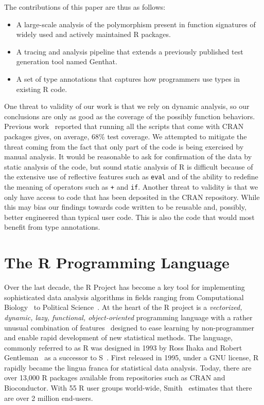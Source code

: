 \documentclass[acmsmall,10pt,review,anonymous]{acmart}\settopmatter{printfolios=true,printccs=false,printacmref=false}
\newcommand{\code}[1]{\lstinline|#1|\xspace}
\newcommand{\genthat}{{\sc Genthat}\xspace}
\begin{document}
The contributions of this paper are thus as follows:
\begin{itemize}
\item A large-scale analysis of the polymorphism present in function
  signatures of \PACKAGES widely used and actively maintained R packages.
\item A tracing and analysis pipeline that extends a previously published
  test generation tool named \genthat.
\item A set of type annotations that captures how programmers use types
in existing R code.
\end{itemize}

One threat to validity of our work is that we rely on dynamic analysis, so
our conclusions are only as good as the coverage of the possibly function
behaviors. Previous work~\cite{issta18} reported that running all the
scripts that come with CRAN packages gives, on average, 68\% test coverage.
We attempted to mitigate the threat coming from the fact that only part of
the code is being exercised by manual analysis. It would be reasonable to
ask for confirmation of the data by static analysis of the code, but sound
static analysis of R is difficult because of the extensive use of reflective
features such as \code{eval} and of the ability to redefine the meaning of
operators such as \code{+} and \code{if}.  Another threat to validity is
that we only have access to code that has been deposited in the CRAN
repository. While this may bias our findings towards code written to be
reusable and, possibly, better engineered than typical user code. This is
also the code that would most benefit from type annotations.

\newpage  %

\section{The R Programming Language}\label{sec:rlang}

Over the last decade, the R Project has become a key tool for implementing
sophisticated data analysis algorithms in fields ranging from Computational
Biology~\cite{R05} to Political Science~\cite{R:Keele:2008}. At the heart of
the R project is a \emph{vectorized, dynamic, lazy, functional,
  object-oriented} programming language with a rather unusual combination of
features~\cite{ecoop12} designed to ease learning by non-programmer and
enable rapid development of new statistical methods.  The language, commonly
referred to as R was designed in 1993 by Ross Ihaka and Robert
Gentleman~\cite{R96} as a successor to S~\cite{S88}.  First released in
1995, under a GNU license, R rapidly became the lingua franca for
statistical data analysis. Today, there are over 13,000 R packages available
from repositories such as CRAN and Bioconductor.  With 55 R user groups
world-wide, Smith~\cite{eco11} estimates that there are over 2 million
end-users.
\end{document}

